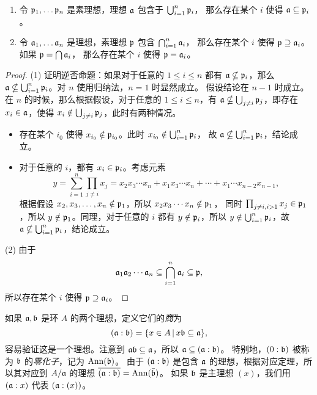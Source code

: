 \begin{proposition}
  \mbox{}
  \begin{enumerate}
    \item 令 $\mathfrak{p}_1,\dots\mathfrak{p}_n$ 是素理想，理想 $\mathfrak{a}$ 包含于 $\bigcup_{i=1}^n\mathfrak{p}_i$，
    那么存在某个 $i$ 使得 $\mathfrak{a}\subseteq\mathfrak{p}_i$。
    \item 令 $\mathfrak{a}_1,\dots\mathfrak{a}_n$ 是理想，素理想 $\mathfrak{p}$ 包含 $\bigcap_{i=1}^n \mathfrak{a}_i$，
    那么存在某个 $i$ 使得 $\mathfrak{p}\supseteq \mathfrak{a}_i$。如果 $\mathfrak{p}=\bigcap \mathfrak{a}_i$，
    那么存在某个 $i$ 使得 $\mathfrak{p}=\mathfrak{a}_i$。
  \end{enumerate}
\end{proposition}
\begin{proof}
  (1) 证明逆否命题：如果对于任意的 $1\leq i\leq n$ 都有 $\mathfrak{a}\nsubseteq\mathfrak{p}_i$，那么
  $\mathfrak{a}\nsubseteq\bigcup_{i=1}^n\mathfrak{p}_i$。对 $n$ 使用归纳法，$n=1$ 时显然成立。
  假设结论在 $n-1$ 时成立。在 $n$ 的时候，那么根据假设，对于任意的 $1\leq i\leq n$，有
  $\mathfrak{a}\nsubseteq\bigcup_{j\neq i} \mathfrak{p}_j$，即存在 $x_i\in\mathfrak{a}$，使得
  $x_i\notin\bigcup_{j\neq i}\mathfrak{p}_j$，此时有两种情况。
  \begin{itemize}[nosep]
    \item 存在某个 $i_0$ 使得 $x_{i_0}\notin\mathfrak{p}_{i_0}$。此时 $x_{i_0}\notin \bigcup_{i=1}^n\mathfrak{p}_i$，
    故 $\mathfrak{a}\nsubseteq\bigcup_{i=1}^n\mathfrak{p}_i$，结论成立。
    \item 对于任意的 $i$，都有 $x_i\in\mathfrak{p}_i$。考虑元素
    \[
      y=\sum_{i=1}^n\prod_{j\neq i}x_j=x_2x_3\cdots x_n+x_1x_3\cdots x_n+\cdots+x_1\cdots x_{n-2}x_{n-1},  
    \]
    根据假设 $x_2,x_3,\dots,x_n\notin\mathfrak{p}_1$，所以 $x_2x_3\cdots x_n\notin\mathfrak{p}_1$，
    同时 $\prod_{j\neq i,i>1}x_j\in\mathfrak{p}_1$，所以
    $y\notin\mathfrak{p}_1$。同理，对于任意的 $i$ 都有 $y\notin \mathfrak{p}_i$，所以
    $y\notin \bigcup_{i=1}^n\mathfrak{p}_i$，故 $\mathfrak{a}\nsubseteq\bigcup_{i=1}^n\mathfrak{p}_i$，结论成立。
  \end{itemize}

  (2) 由于
  \[
    \mathfrak{a}_1\mathfrak{a}_2\cdots\mathfrak{a}_n\subseteq
    \bigcap_{i=1}^n\mathfrak{a}_i\subseteq\mathfrak{p},
  \]
  所以存在某个 $i$ 使得 $\mathfrak{p}\supseteq \mathfrak{a}_i$。
\end{proof}

如果 $\mathfrak{a},\mathfrak{b}$ 是环 $A$ 的两个理想，定义它们的\emph{商}为
\[
(\mathfrak{a}:\mathfrak{b})=\{x\in A\,|\, x\mathfrak{b}\subseteq\mathfrak{a}\},  
\]
容易验证这是一个理想。注意到 $\mathfrak{ab}\subseteq\mathfrak{a}$，所以 $\mathfrak{a}\subseteq(\mathfrak{a}:\mathfrak{b})$。
特别地，$(0:\mathfrak{b})$ 被称为 $\mathfrak{b}$ 的\emph{零化子}，记为 $\operatorname{Ann}(\mathfrak{b})$。
由于 $(\mathfrak{a}:\mathfrak{b})$ 是包含 $\mathfrak{a}$ 的理想，根据对应定理，所以其对应到
$A/\mathfrak{a}$ 的理想 $\overline{(\mathfrak{a}:\mathfrak{b})}=\operatorname{Ann}(\bar{\mathfrak{b}})$。
如果 $\mathfrak{b}$ 是主理想 $(x)$，我们用 $(\mathfrak{a}:x)$ 代表 $(\mathfrak{a}:(x))$。

